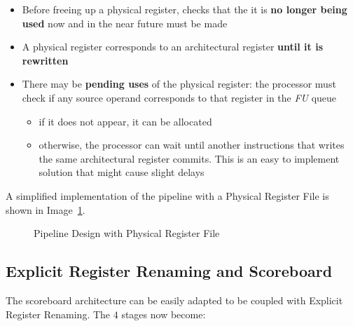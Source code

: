 \documentclass[english]{article}
\begin{document}
\begin{itemize}
  \item Before freeing up a physical register, checks that the it is \textbf{no longer being used} now and in the near future must be made
  \item A physical register corresponds to an architectural register \textbf{until it is rewritten}
  \item There may be \textbf{pending uses} of the physical register: the processor must check if any source operand corresponds to that register in the \textit{FU} queue
        \begin{itemize}
          \item if it does not appear, it can be allocated
          \item otherwise, the processor can wait until another instructions that writes the same architectural register commits. This is an easy to implement solution that might cause slight delays
        \end{itemize}
\end{itemize}

A simplified implementation of the pipeline with a Physical Register File is shown in Image~\ref{fig:pipeline-design-with-physical-register-file}.

\begin{figure}[htbp]
  \bigskip
  \centering
  \caption{Pipeline Design with Physical Register File}
  \label{fig:pipeline-design-with-physical-register-file}
  \bigskip
\end{figure}

\subsection{Explicit Register Renaming and Scoreboard}

The scoreboard architecture can be easily adapted to be coupled with Explicit Register Renaming.
The \(4\) stages now become:
\end{document}

